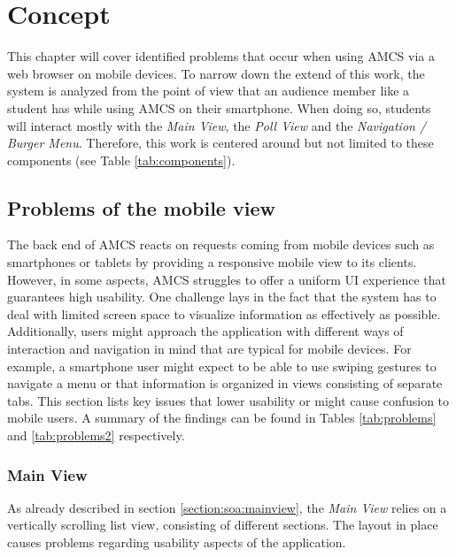 \chapter{Concept}
\label{chapter:concept}
This chapter will cover identified problems that occur when using AMCS via a web browser on mobile
devices. To narrow down the extend of this work, the system is analyzed from the point of view that an audience member like a student has while using AMCS on their smartphone. When doing so, students will interact mostly with the \emph{Main View}, the \emph{Poll View} and the \emph{Navigation / Burger Menu}. Therefore, this work is centered around but not limited to these components (see Table \ref{tab:components}).

\section{Problems of the mobile view}
\label{section:con:problems}
The back end of AMCS reacts on requests coming from mobile devices such as smartphones or tablets by providing a responsive mobile view to its clients. However, in some aspects, AMCS struggles to offer a uniform UI experience that guarantees high usability.
One challenge lays in the fact that the system has to deal with limited screen space to visualize information as effectively as possible. Additionally, users might approach the application with different ways of interaction and navigation in mind that are typical for mobile devices. For example, a smartphone user might expect to be able to use swiping gestures to navigate a menu or that information is organized in views consisting of separate tabs. This section lists key issues that lower usability or might cause confusion to mobile users. A summary of the findings can be found in Tables \ref{tab:problems} and \ref{tab:problems2} respectively.

\subsection{Main View}
As already described in section \ref{section:soa:mainview}, the \emph{Main View} relies on a vertically scrolling list view, consisting of different sections. The layout in place causes problems regarding usability aspects of the application.

